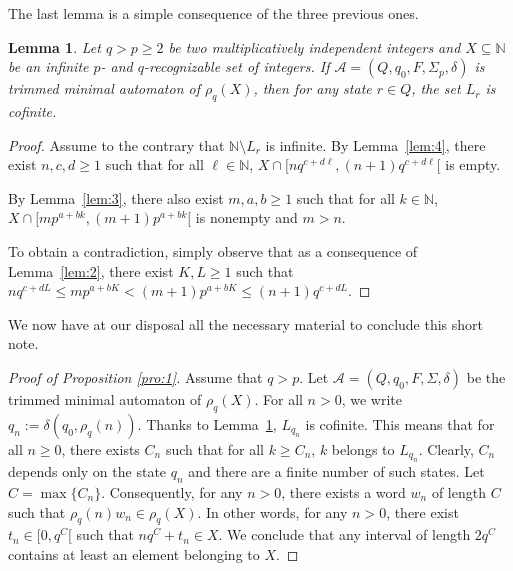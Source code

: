 \documentclass{beatcs}
\newtheorem{lemma}[proposition]{Lemma}
\begin{document}
The last lemma is a simple consequence of the three previous ones.

\begin{lemma}\label{lem:5}
  Let $q>p\ge 2$ be two multiplicatively independent integers and
  $X\subseteq\mathbb{N}$ be an infinite $p$- and $q$-recognizable set
  of integers. If $\mathcal{A}=(Q,q_0,F,\Sigma_p,\delta)$ is trimmed
  minimal automaton of $\rho_q(X)$, then for any state $r\in Q$, the
  set $L_r$ is cofinite.
\end{lemma}

\begin{proof}
    Assume to the contrary that $\mathbb{N}\setminus L_r$ is infinite.
    By Lemma~\ref{lem:4}, there exist $n,c,d\ge 1$ such that for
    all $\ell\in\mathbb{N}$, $X\cap[nq^{c+d\ell},(n+1)q^{c+d\ell}[$ is
    empty.
    
    By Lemma~\ref{lem:3}, there also exist $m,a,b\ge 1$ such that for
    all $k\in\mathbb{N}$, $X\cap[mp^{a+bk},(m+1)p^{a+bk}[$ is nonempty
    and $m>n$.
  
  
  
  To obtain a contradiction, simply observe that as a consequence of
  Lemma~\ref{lem:2}, there exist $K,L \ge 1$ such that
  $nq^{c+dL} \le mp^{a+bK} < (m+1)p^{a+bK} \le (n+1)q^{c+dL}$.
\end{proof}

We now have at our disposal all the necessary material to conclude
this short note.
\begin{proof}[Proof of Proposition \ref{pro:1}]
  Assume that $q>p$. Let $\mathcal{A}=(Q,q_0,F,\Sigma,\delta)$ be the
  trimmed minimal automaton of $\rho_q(X)$. For all $n> 0$, we write
  $q_n:=\delta(q_0,\rho_q(n))$.  Thanks to Lemma~\ref{lem:5},
  $L_{q_n}$ is cofinite. This means that for all $n\ge 0$, there
  exists $C_n$ such that for all $k\ge C_n$, $k$ belongs to $L_{q_n}$.
  Clearly, $C_n$ depends only on the state $q_n$ and there are a
  finite number of such states. Let $C=\max\{C_n\}$. Consequently, for
  any $n>0$, there exists a word $w_n$ of length $C$ such that
  $\rho_q(n)w_n\in \rho_q(X)$. In other words, for any $n>0$, there
  exist $t_n\in[0,q^C[$ such that $nq^C+t_n\in X$. We conclude that
  any interval of length $2q^C$ contains at least an element belonging
  to $X$.
\end{proof}
\end{document}
